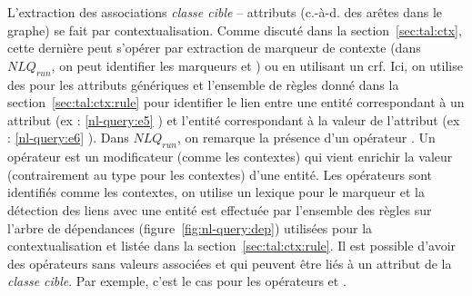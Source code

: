 L'extraction des associations \emph{classe cible} -- attributs (c.-à-d. des arêtes dans le graphe) se fait par contextualisation.
Comme discuté dans la section~\ref{sec:tal:ctx}, cette dernière peut s'opérer par extraction de marqueur de contexte (dans $NLQ_{run}$, on peut identifier les marqueurs  et ) ou en utilisant un \gls{crf}.
Ici, on utilise des  pour les attributs génériques et l'ensemble de règles donné dans la section~\ref{sec:tal:ctx:rule} pour identifier le lien entre une entité correspondant à un attribut (ex : \ref{nl-query:e5} ) et l'entité correspondant à la valeur de l'attribut (ex : \ref{nl-query:e6} ).
Dans $NLQ_{run}$, on remarque la présence d'un opérateur .
Un opérateur est un modificateur (comme les contextes) qui vient enrichir la valeur (contrairement au type pour les contextes) d'une entité.
Les opérateurs sont identifiés comme les contextes, on utilise un lexique pour le marqueur et la détection des liens avec une entité est effectuée par l'ensemble des règles sur l'arbre de dépendances (figure~\ref{fig:nl-query:dep}) utilisées pour la contextualisation et listée dans la section~\ref{sec:tal:ctx:rule}.
Il est possible d'avoir des opérateurs sans valeurs associées et qui peuvent être liés à un attribut de la \emph{classe cible}.
Par exemple, c'est le cas pour les opérateurs  et .

